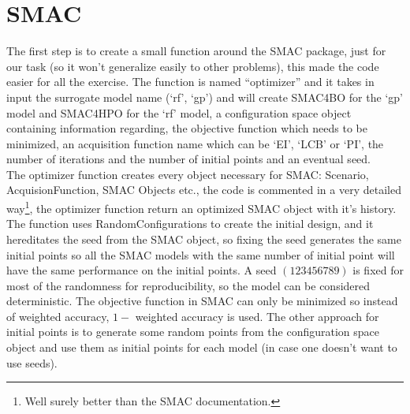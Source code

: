 \documentclass[12pt, onecolumn]{article}
\begin{document}
\section*{SMAC}
The first step is to create a small function around the SMAC package, just for our task (so it won't generalize easily to other problems), this made the code easier for all the exercise.
The function is named ``optimizer'' and it takes in input the surrogate model name (`rf', `gp') and will create SMAC4BO for the `gp' model and SMAC4HPO for the `rf' model, a configuration space object containing information regarding, the objective function which needs to be minimized, an acquisition function name which can be `EI', `LCB' or `PI', the number of iterations and the number of initial points and an eventual seed.\\
The optimizer function creates every object necessary for SMAC: Scenario, AcquisionFunction, SMAC Objects etc., the code is commented in a very detailed way\footnote{Well surely better than the SMAC documentation.}, the optimizer function return an optimized SMAC object with it's history.
The function uses RandomConfigurations to create the initial design, and it hereditates the seed from the SMAC object, so fixing the seed generates the same initial points so all the SMAC models with the same number of initial point will have the same performance on the initial points.
A seed $(123456789)$ is fixed for most of the randomness for reproducibility, so the model can be considered deterministic.
The objective function in SMAC can only be minimized so instead of weighted accuracy, $1 -$ weighted accuracy is used.
The other approach for initial points is to generate some random points from the configuration space object and use them as initial points for each model (in case one doesn't want to use seeds). 
\end{document}
